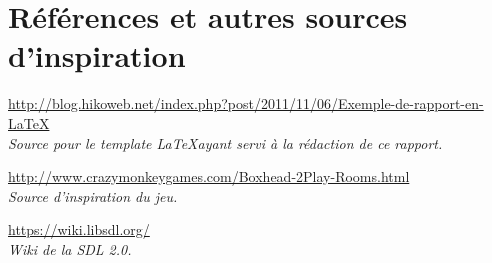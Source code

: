 \section*{Références et autres sources d'inspiration}
	
\url{http://blog.hikoweb.net/index.php?post/2011/11/06/Exemple-de-rapport-en-LaTeX} \\
\emph{Source pour le template \LaTeX ayant servi à la rédaction de ce rapport.}

\url{http://www.crazymonkeygames.com/Boxhead-2Play-Rooms.html} \\
\emph{Source d'inspiration du jeu.}

\url{https://wiki.libsdl.org/} \\
\emph{Wiki de la SDL 2.0.}

